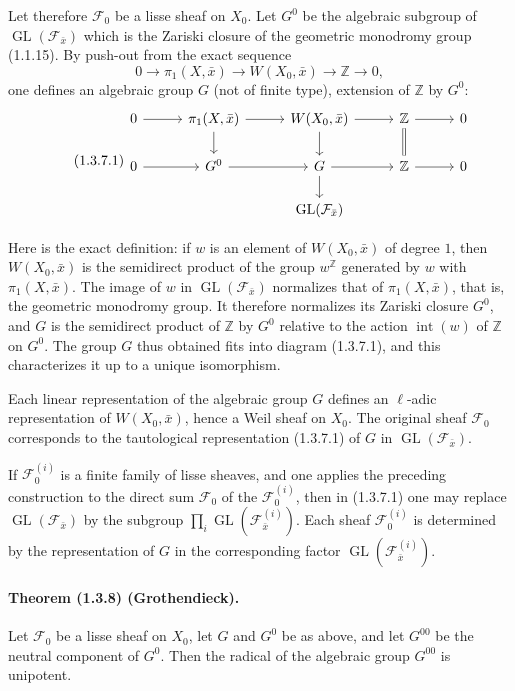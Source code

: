 \documentclass[11pt]{article}
\theoremstyle{remark}
\newcommand{\ZZ}{\mathbb{Z}}
\newcommand{\GL}{\operatorname{GL}}
\begin{document}
Let therefore $\mathcal F_0$ be a lisse sheaf on $X_0$. Let $G^0$ be the algebraic subgroup of $\GL(\mathcal F_{\bar x})$ which is the Zariski closure of the geometric monodromy group (1.1.15). By push-out from the exact sequence
\[
0\to\pi_1(X,\bar x)\to W(X_0,\bar x)\to\ZZ\to0,
\]
one defines an algebraic group $G$ (not of finite type), extension of $\ZZ$ by $G^0$:
\begin{equation}
\tag{1.3.7.1}
\begin{tikzcd}[column sep=2.8em,row sep=1.6em]
0 \arrow[r] & \pi_1(X,\bar x) \arrow[r] \arrow[d] & W(X_0,\bar x) \arrow[r] \arrow[d] & \ZZ \arrow[r] \arrow[d,equal] & 0 \\
0 \arrow[r] & G^0 \arrow[r] & G \arrow[r] \arrow[d] & \ZZ \arrow[r] & 0 \\
& & \GL(\mathcal F_{\bar x}) & &
\end{tikzcd}
\end{equation}

Here is the exact definition: if $w$ is an element of $W(X_0,\bar x)$ of degree $1$, then $W(X_0,\bar x)$ is the semidirect product of the group $w^\ZZ$ generated by $w$ with $\pi_1(X,\bar x)$. The image of $w$ in $\GL(\mathcal F_{\bar x})$ normalizes that of $\pi_1(X,\bar x)$, that is, the geometric monodromy group. It therefore normalizes its Zariski closure $G^0$, and $G$ is the semidirect product of $\ZZ$ by $G^0$ relative to the action $\operatorname{int}(w)$ of $\ZZ$ on $G^0$. The group $G$ thus obtained fits into diagram (1.3.7.1), and this characterizes it up to a unique isomorphism.

Each linear representation of the algebraic group $G$ defines an $\ell$-adic representation of $W(X_0,\bar x)$, hence a Weil sheaf on $X_0$. The original sheaf $\mathcal F_0$ corresponds to the tautological representation (1.3.7.1) of $G$ in $\GL(\mathcal F_{\bar x})$.

If $\mathcal F_0^{(i)}$ is a finite family of lisse sheaves, and one applies the preceding construction to the direct sum $\mathcal F_0$ of the $\mathcal F_0^{(i)}$, then in (1.3.7.1) one may replace $\GL(\mathcal F_{\bar x})$ by the subgroup $\prod_i\GL(\mathcal F_{\bar x}^{(i)})$. Each sheaf $\mathcal F_0^{(i)}$ is determined by the representation of $G$ in the corresponding factor $\GL(\mathcal F_{\bar x}^{(i)})$.

\paragraph{Theorem (1.3.8) (Grothendieck).} Let $\mathcal F_0$ be a lisse sheaf on $X_0$, let $G$ and $G^0$ be as above, and let $G^{00}$ be the neutral component of $G^0$. Then the radical of the algebraic group $G^{00}$ is unipotent.
\end{document}
